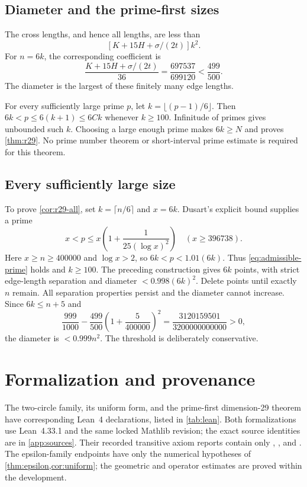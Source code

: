 \subsection{Diameter and the prime-first sizes}

The cross lengths, and hence all lengths, are less than
\[
 [K+15H+\sigma/(2t)]k^2.
\]
For $n=6k$, the corresponding coefficient is
\begin{equation}\label{eq:diameter29}
 \frac{K+15H+\sigma/(2t)}{36}
 =\frac{697537}{699120}<\frac{499}{500}.
\end{equation}
The diameter is the largest of these finitely many edge lengths.

For every sufficiently large prime $p$, let $k=\lfloor(p-1)/6\rfloor$.
Then $6k<p\le6(k+1)\le6Ck$ whenever $k\ge100$. Infinitude of primes gives
unbounded such $k$. Choosing a large enough prime makes $6k\ge N$ and
proves \cref{thm:r29}. No prime number theorem or short-interval prime
estimate is required for this theorem.

\subsection{Every sufficiently large size}

To prove \cref{cor:r29-all}, set $k=\lceil n/6\rceil$ and $x=6k$.
Dusart's explicit bound \cite[Proposition~6.8]{Dusart} supplies a prime
\[
 x<p\le x\left(1+\frac{1}{25(\log x)^2}\right)
 \quad(x\ge396738).
\]
Here $x\ge n\ge400000$ and $\log x>2$, so $6k<p<1.01(6k)$.
Thus \eqref{eq:admissible-prime} holds and $k\ge100$. The preceding
construction gives $6k$ points, with strict edge-length separation and
diameter $<0.998(6k)^2$. Delete points until exactly $n$ remain.
All separation properties persist and the diameter cannot increase.
Since $6k\le n+5$ and
\[
 \frac{999}{1000}
 -\frac{499}{500}\left(1+\frac{5}{400000}\right)^2
 =\frac{3120159501}{3200000000000}>0,
\]
the diameter is $<0.999n^2$. The threshold is deliberately conservative.

\section{Formalization and provenance}\label{sec:formal}

The two-circle family, its uniform form, and the prime-first dimension-29
theorem have corresponding Lean~4 declarations, listed in
\cref{tab:lean}. Both formalizations use Lean~4.33.1 and the same locked
Mathlib revision; the exact source identities are in \cref{app:sources}.
Their recorded transitive axiom reports contain only
, , and .
The epsilon-family endpoints have only the numerical hypotheses of
\cref{thm:epsilon,cor:uniform}; the geometric and operator estimates are
proved within the development.

